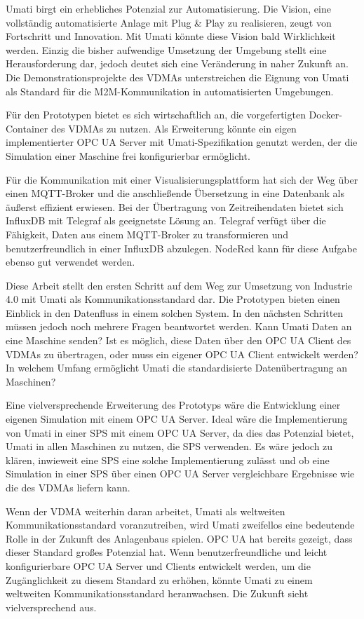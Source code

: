 \documentclass[a4paper, 12pt, oneside, toc=listofnumbered, bibliography=totoc]{scrbook}
\begin{document}
		Umati birgt ein erhebliches Potenzial zur Automatisierung. Die Vision, eine vollständig automatisierte Anlage mit Plug \& Play zu realisieren, zeugt von Fortschritt und Innovation. Mit Umati könnte diese Vision bald Wirklichkeit werden. Einzig die bisher aufwendige Umsetzung der Umgebung stellt eine Herausforderung dar, jedoch deutet sich eine Veränderung in naher Zukunft an. Die Demonstrationsprojekte des VDMAs unterstreichen die Eignung von Umati als Standard für die M2M-Kommunikation in automatisierten Umgebungen.
		
		Für den Prototypen bietet es sich wirtschaftlich an, die vorgefertigten Docker-Container des VDMAs zu nutzen. Als Erweiterung könnte ein eigen implementierter OPC UA Server mit Umati-Spezifikation genutzt werden, der die Simulation einer Maschine frei konfigurierbar ermöglicht.
		
		Für die Kommunikation mit einer Visualisierungsplattform hat sich der Weg über einen MQTT-Broker und die anschließende Übersetzung in eine Datenbank als äußerst effizient erwiesen. Bei der Übertragung von Zeitreihendaten bietet sich InfluxDB mit Telegraf als geeignetste Lösung an. Telegraf verfügt über die Fähigkeit, Daten aus einem MQTT-Broker zu transformieren und benutzerfreundlich in einer InfluxDB abzulegen. NodeRed kann für diese Aufgabe ebenso gut verwendet werden.
		
		Diese Arbeit stellt den ersten Schritt auf dem Weg zur Umsetzung von Industrie 4.0 mit Umati als Kommunikationsstandard dar. Die Prototypen bieten einen Einblick in den Datenfluss in einem solchen System. In den nächsten Schritten müssen jedoch noch mehrere Fragen beantwortet werden. Kann Umati Daten an eine Maschine senden? Ist es möglich, diese Daten über den OPC UA Client des VDMAs zu übertragen, oder muss ein eigener OPC UA Client entwickelt werden? In welchem Umfang ermöglicht Umati die standardisierte Datenübertragung an Maschinen?
		
		Eine vielversprechende Erweiterung des Prototyps wäre die Entwicklung einer eigenen Simulation mit einem OPC UA Server. Ideal wäre die Implementierung von Umati in einer SPS mit einem OPC UA Server, da dies das Potenzial bietet, Umati in allen Maschinen zu nutzen, die SPS verwenden. Es wäre jedoch zu klären, inwieweit eine SPS eine solche Implementierung zulässt und ob eine Simulation in einer SPS über einen OPC UA Server vergleichbare Ergebnisse wie die des VDMAs liefern kann.
		
		Wenn der VDMA weiterhin daran arbeitet, Umati als weltweiten Kommunikationsstandard voranzutreiben, wird Umati zweifellos eine bedeutende Rolle in der Zukunft des Anlagenbaus spielen. OPC UA hat bereits gezeigt, dass dieser Standard großes Potenzial hat. Wenn benutzerfreundliche und leicht konfigurierbare OPC UA Server und Clients entwickelt werden, um die Zugänglichkeit zu diesem Standard zu erhöhen, könnte Umati zu einem weltweiten Kommunikationsstandard heranwachsen. Die Zukunft sieht vielversprechend aus.
	
\end{document}
